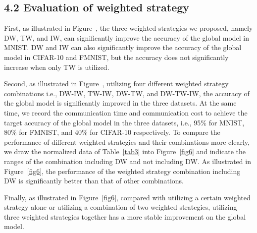 \documentclass[twoside,twocolumn]{article}
\begin{document}
\begin{spacing}{1.0}
\subsection{4.2 Evaluation of weighted strategy}

	First, as illustrated in Figure~, the three weighted strategies we proposed, namely DW, TW, and IW, can significantly improve the accuracy of the global model in MNIST. DW and IW can also significantly improve the accuracy of the global model in CIFAR-10 and FMNIST, but the accuracy does not significantly increase when only TW is utilized.
	
	Second, as illustrated in Figure~, utilizing four different weighted strategy combinations i.e., DW-IW, TW-IW, DW-TW, and DW-TW-IW, the accuracy of the global model is significantly improved in the three datasets. At the same time, we record the communication time and communication cost to achieve the target accuracy of the global model in the three datasets, i.e., 95\% for MNIST, 80\% for FMNIST, and 40\% for CIFAR-10 respectively.  To compare the performance of different weighted strategies and their combinations more clearly, we draw the normalized data of Table~\ref{tab3} into Figure~\ref{fig6} and indicate the ranges of the combination including DW and not including DW. As illustrated in Figure~\ref{fig6}, the performance of the weighted strategy combination including DW is significantly better than that of other combinations.
	
	Finally, as illustrated in Figure~\ref{fig6}, compared with utilizing a certain weighted strategy alone or utilizing a combination of two weighted strategies, utilizing three weighted strategies together has a more stable improvement on the global model.	
%
%
%
\vspace{-0.2cm}

\end{spacing}
\end{document}
